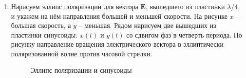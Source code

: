 \documentclass[12pt,a4paper]{article}
\begin{document}
	\begin{enumerate}
		\item Нарисуем эллипс поляризации для вектора $\boldsymbol{E}$, вышедшего из пластинки $\lambda$/4, и укажем на нём направления большей и меньшей скорости. На рисунке $x$ -- большая скорость, а $y$ -- меньшая. Рядом нарисуем две вышедших из пластинки синусоиды: $x(t)$ и $y(t)$ со сдвигом фаз в четверть периода. По рисунку направление вращения электрического вектора в эллиптически поляризованной волне против часовой стрелки.
		
		\begin{figure}[h!]
			\begin{minipage}[h!]{0.49\linewidth}
			\end{minipage}
			\hfill
			\begin{minipage}[h!]{0.49\linewidth}
			\end{minipage}
			\caption{Эллипс поляризации и синусоиды}
		\end{figure}
	

\end{enumerate}
\end{document}
